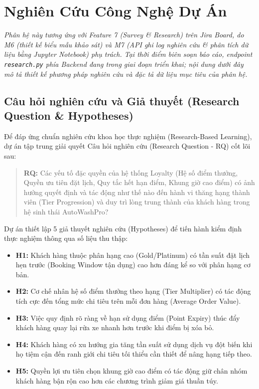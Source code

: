 \chapter{Nghiên Cứu Công Nghệ Dự Án}
\textit{Phân hệ này tương ứng với Feature 7 (Survey \& Research) trên Jira Board, do M6 (thiết kế biểu mẫu khảo sát) và M7 (API ghi log nghiên cứu \& phân tích dữ liệu bằng Jupyter Notebook) phụ trách. Tại thời điểm biên soạn báo cáo, endpoint \texttt{research.py} phía Backend đang trong giai đoạn triển khai; nội dung dưới đây mô tả thiết kế phương pháp nghiên cứu và đặc tả dữ liệu mục tiêu của phân hệ.}

\section{Câu hỏi nghiên cứu và Giả thuyết (Research Question \& Hypotheses)}
Để đáp ứng chuẩn nghiên cứu khoa học thực nghiệm (Research-Based Learning), dự án tập trung giải quyết Câu hỏi nghiên cứu (Research Question - RQ) cốt lõi sau:
\begin{quote}
    \textbf{RQ:} Các yếu tố đặc quyền của hệ thống Loyalty (Hệ số điểm thưởng, Quyền ưu tiên đặt lịch, Quy tắc hết hạn điểm, Khung giờ cao điểm) có ảnh hưởng quyết định và tác động như thế nào đến hành vi thăng hạng thành viên (Tier Progression) và duy trì lòng trung thành của khách hàng trong hệ sinh thái AutoWashPro?
\end{quote}

\noindent Dự án thiết lập 5 giả thuyết nghiên cứu (Hypotheses) để tiến hành kiểm định thực nghiệm thông qua số liệu thu thập:
\begin{itemize}
    \item \textbf{H1:} Khách hàng thuộc phân hạng cao (Gold/Platinum) có tần suất đặt lịch hẹn trước (Booking Window tận dụng) cao hơn đáng kể so với phân hạng cơ bản.
    \item \textbf{H2:} Cơ chế nhân hệ số điểm thưởng theo hạng (Tier Multiplier) có tác động tích cực đến tổng mức chi tiêu trên mỗi đơn hàng (Average Order Value).
    \item \textbf{H3:} Việc quy định rõ ràng về hạn sử dụng điểm (Point Expiry) thúc đẩy khách hàng quay lại rửa xe nhanh hơn trước khi điểm bị xóa bỏ.
    \item \textbf{H4:} Khách hàng có xu hướng gia tăng tần suất sử dụng dịch vụ đột biến khi họ tiệm cận đến ranh giới chi tiêu tối thiểu cần thiết để nâng hạng tiếp theo.
    \item \textbf{H5:} Quyền lợi ưu tiên chọn khung giờ cao điểm có tác động giữ chân nhóm khách hàng bận rộn cao hơn các chương trình giảm giá thuần túy.
\end{itemize}

